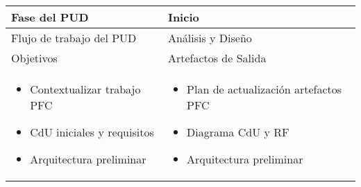 \vspace{1cm}
\begin{tabular}{|p{}|p{}|}

\hline

Fase del PUD & Inicio 
 \\
\hline

Flujo de trabajo del PUD & Análisis y Diseño
 \\
\hline

Objetivos  &
Artefactos de Salida \\
\hline

\begin{itemize}
\item Contextualizar trabajo PFC
\item CdU iniciales y requisitos
\item Arquitectura preliminar
\end{itemize}

&

\begin{itemize}
\item Plan de actualización artefactos PFC
\item Diagrama CdU y RF
\item Arquitectura preliminar
\end{itemize} \\
\hline
\end{tabular}

